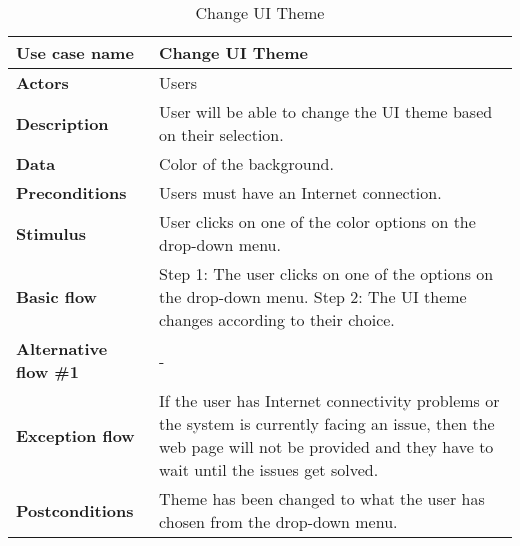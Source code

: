 \documentclass[listof=nochaptergap]{report}
\begin{document}
    \begin{table}[H]
        \centering
         \begin{tabular}{| p{4cm} | p{10cm} |} 
         \hline
         \textbf{Use case name} & Change UI Theme \\
         \hline
         \textbf{Actors} & Users \\
         \hline
         \textbf{Description} & User will be able to change the UI theme based on their selection. \\
         \hline
         \textbf{Data} &  Color of the background.\\
         \hline
         \textbf{Preconditions} & Users must have an Internet connection. \\
         \hline
         \textbf{Stimulus} & User clicks on one of the color options on the drop-down menu. \\
         \hline
         \textbf{Basic flow} & Step 1: The user clicks on one of the options on the drop-down menu. \newline Step 2: The UI theme changes according to their choice. \\
         \hline
         \textbf{Alternative flow \#1} & - \\
         \hline
         \textbf{Exception flow} & If the user has Internet connectivity problems or the system is currently facing an issue, then the web page will not be provided and they have to wait until the issues get solved. \\
         \hline
         \textbf{Postconditions} & Theme has been changed to what the user has chosen from the drop-down menu. \\
         \hline
         \end{tabular}
        \caption{Change UI Theme}
        \label{tab:table5}
    \end{table}
\end{document}
